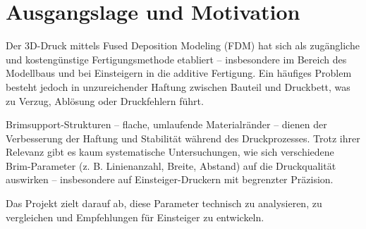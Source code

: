 \chapter{Ausgangslage und Motivation}
\label{cha:Ausgangslage und Motivation}

Der 3D-Druck mittels Fused Deposition Modeling (FDM) hat sich als zugängliche und kostengünstige Fertigungsmethode etabliert – insbesondere im Bereich des Modellbaus und bei Einsteigern in die additive Fertigung.
Ein häufiges Problem besteht jedoch in unzureichender Haftung zwischen Bauteil und Druckbett, was zu Verzug, Ablösung oder Druckfehlern führt.

Brimsupport-Strukturen – flache, umlaufende Materialränder – dienen der Verbesserung der Haftung und Stabilität während des Druckprozesses.
Trotz ihrer Relevanz gibt es kaum systematische Untersuchungen, wie sich verschiedene Brim-Parameter (z. B. Linienanzahl, Breite, Abstand) auf die Druckqualität auswirken – insbesondere auf Einsteiger-Druckern mit begrenzter Präzision.

Das Projekt zielt darauf ab, diese Parameter technisch zu analysieren, zu vergleichen und Empfehlungen für Einsteiger zu entwickeln.